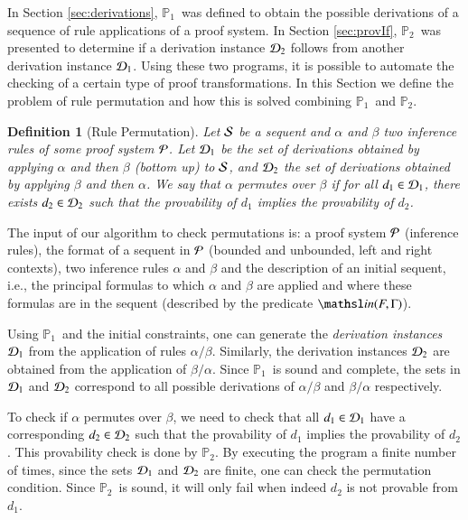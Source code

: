 \documentclass{new_tlp}
\newcommand{\In}[2]{\ensuremath{\tsl{in}(\ensuremath{#1},\ensuremath{#2})}}
\newcommand\LPder{\ensuremath{\mathbb{P}_1}}
\newcommand\LPprov{\ensuremath{\mathbb{P}_2}}
\newtheorem{definition}[theorem]{Definition}
\begin{document}
In Section \ref{sec:derivations}, \LPder\ was defined to obtain the
possible derivations of a sequence of rule applications of a proof system. In
Section \ref{sec:provIf}, \LPprov\ was presented to determine if a
derivation instance $\Dscr_2$ follows from another derivation instance $\Dscr_1$. Using these two
programs, it is possible to automate the checking of a certain type of proof
transformations. In this Section we define the problem of rule permutation and
how this is solved combining \LPder\ and \LPprov.

\begin{definition}[Rule Permutation]
Let $\Sscr$ be a sequent and $\alpha$ and $\beta$ two inference rules of some
proof system $\Pscr$. Let $\Dscr_1$ be the set of derivations obtained by
applying $\alpha$ and then $\beta$ (bottom up) to $\Sscr$, and $\Dscr_2$ the set
of derivations obtained by applying $\beta$ and then $\alpha$. We say that
$\alpha$ \emph{permutes over} $\beta$ if for all $d_1 \in \Dscr_1$, there exists
$d_2 \in \Dscr_2$ such that the provability of $d_1$ implies the provability of
$d_2$.
\end{definition}

The input of our algorithm to check permutations is: a proof system $\Pscr$
(inference rules), the format of a sequent in $\Pscr$ (bounded and unbounded,
left and right contexts), two inference rules $\alpha$ and $\beta$ and the
description of an initial sequent, i.e., the principal formulas to which
$\alpha$ and $\beta$ are applied and where these formulas are in the sequent
(described by the predicate $\In{F}{\Gamma}$).

Using \LPder\ and the initial constraints, one can generate the \emph{derivation
instances} $\Dscr_1$ from the application of rules $\alpha / \beta$. Similarly,
the derivation instances $\Dscr_2$ are obtained from the application of $\beta / \alpha$.
Since \LPder\ is sound and complete, the sets in $\Dscr_1$ and $\Dscr_2$
correspond to all possible derivations of $\alpha / \beta$ and $\beta / \alpha$
respectively.

To check if $\alpha$ permutes over $\beta$, we need to check that all $d_1 \in
\Dscr_1$ have a corresponding $d_2 \in \Dscr_2$ such that the provability of
$d_1$ implies the provability of $d_2$. This provability check is done by
\LPprov. By executing the program a finite number of times, since the sets $\Dscr_1$
and $\Dscr_2$ are finite, one can check the permutation condition. Since
\LPprov\ is sound, it will only fail when indeed $d_2$ is not provable from
$d_1$.
\end{document}
